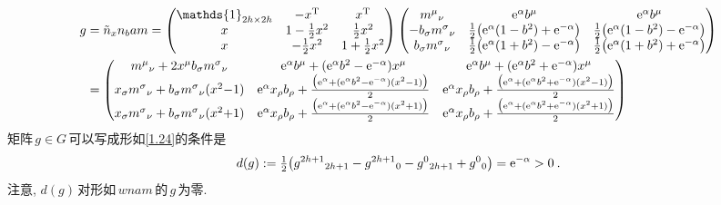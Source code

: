 \begin{align}
    g&=\tilde{n}_{x}n_{b}am =
    \begin{pmatrix}
        \mathds{1}_{2h\times 2h} & -x^{\mathrm{T}} &  x^{\mathrm{T}} \\
        x  & 1-\tfrac{1}{2}x^{2} & \tfrac{1}{2}x^{2} \\
        x & -\tfrac{1}{2}x^{2} & 1+\tfrac{1}{2}x^{2}
    \end{pmatrix}
    \begin{pmatrix}
        m^{\mu}{}_{\nu} & \me^{\alpha}b^{\mu} & \me^{\alpha}b^{\mu} \\
        -b_{\sigma}m^{\sigma}{}_{\nu} & \frac{1}{2}\bigl(\me^{\alpha}(1-b^{2})+\me^{-\alpha}\bigr)&
        \frac{1}{2}\bigl(\me^{\alpha}(1-b^{2})-\me^{-\alpha}\bigr) \\
        b_{\sigma}m^{\sigma}{}_{\nu} &\frac{1}{2}\bigl(\me^{\alpha}(1+b^{2})-\me^{-\alpha}\bigr)&
        \frac{1}{2}\bigl(\me^{\alpha}(1+b^{2})+\me^{-\alpha}\bigr)
    \end{pmatrix} \nonumber \vspace{10pt} \\ 
    &= \begin{pmatrix}
        m^{\mu}{}_{\nu}+2x^{\mu}b_{\sigma}m^{\sigma}{}_{\nu} & \me^{\alpha} b^{\mu}+ (\me^{\alpha}b^{2}-\me^{-\alpha})x^{\mu} &
        \me^{\alpha}b^{\mu}+ (\me^{\alpha}b^{2}+\me^{-\alpha})x^{\mu}  \\
        x_{\sigma}m^{\sigma}{}_{\nu}+b_{\sigma}m^{\sigma}{}_{\nu}(x^{2}{-}1) &
        \me^{\alpha} x_{\rho}b_{\rho} +\frac{\bigl( \me^{\alpha}+(\me^{\alpha}b^{2}-\me^{-\alpha})(x^{2}-1)\bigr)}{2} &
        \me^{\alpha} x_{\rho}b_{\rho} +\frac{\bigl( \me^{\alpha}+(\me^{\alpha}b^{2}+\me^{-\alpha})(x^{2}-1)\bigr)}{2} \\
        x_{\sigma}m^{\sigma}{}_{\nu}+b_{\sigma}m^{\sigma}{}_{\nu}(x^{2}{+}1) &
        \me^{\alpha} x_{\rho}b_{\rho} +\frac{\bigl( \me^{\alpha}+(\me^{\alpha}b^{2}-\me^{-\alpha})(x^{2}+1)\bigr)}{2} &
        \me^{\alpha} x_{\rho}b_{\rho} +\frac{\bigl( \me^{\alpha}+(\me^{\alpha}b^{2}+\me^{-\alpha})(x^{2}+1)\bigr)}{2}
    \end{pmatrix} \label{1.24}
\end{align}
矩阵$\,g\in G\,$可以写成形如\eqref{1.24}的条件是
\begin{equation}
    d(g):=\tfrac{1}{2}\bigl(g^{2h+1}{}_{2h+1}-g^{2h+1}{}_{0}-g^{0}{}_{2h+1}+g^{0}{}_{0}\bigr) =\mathrm{e}^{-\alpha} >0 \:. \label{1.25}
\end{equation}
注意, $d(g)\,$对形如$\,wnam\,$的$\,g\,$为零.

